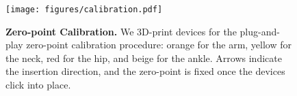\begin{figure}[t]
  \centering
  \texttt{[image: figures/calibration.pdf]}
  \caption{\textbf{Zero-point Calibration.} We 3D-print devices for the plug-and-play zero-point calibration procedure: orange for the arm, yellow for the neck, red for the hip, and beige for the ankle. Arrows indicate the insertion direction, and the zero-point is fixed once the devices click into place.}
  \label{fig:calibration}
  \vspace{-4mm}
\end{figure}
